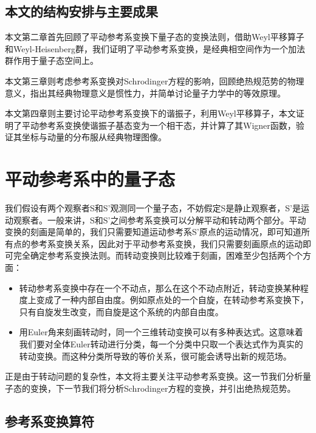 \documentclass[a4paper]{article}
\begin{document}
    \subsection{本文的结构安排与主要成果}

        本文第二章首先回顾了平动参考系变换下量子态的变换法则，借助Weyl平移算子和Weyl-Heisenberg群，我们证明了平动参考系变换，是经典相空间作为一个加法群作用于量子态空间上。

        本文第三章则考虑参考系变换对Schrodinger方程的影响，回顾绝热规范势的物理意义，指出其经典物理意义是惯性力，并简单讨论量子力学中的等效原理。

        本文第四章则主要讨论平动参考系变换下的谐振子，利用Weyl平移算子，本文证明了平动参考系变换使谐振子基态变为一个相干态，并计算了其Wigner函数，验证其坐标与动量的分布服从经典物理图像。



    \section{平动参考系中的量子态}
        
        我们假设有两个观察者S和S'观测同一个量子态，不妨假定S是静止观察者，S'是运动观察者。一般来讲，S和S'之间参考系变换可以分解平动和转动两个部分。平动变换的刻画是简单的，我们只需要知道运动参考系S'原点的运动情况，即可知道所有点的参考系变换关系，因此对于平动参考系变换，我们只需要刻画原点的运动即可完全确定参考系变换法则。而转动变换则比较难于刻画，困难至少包括两个个方面：
        
        \begin{itemize}
            \item 转动参考系变换中存在一个不动点，那么在这个不动点附近，转动变换某种程度上变成了一种内部自由度。例如原点处的一个自旋，在转动参考系变换下，只有自旋发生改变，而自旋是这个系统的内部自由度。
            \item 用Euler角来刻画转动时，同一个三维转动变换可以有多种表达式。这意味着我们要对全体Euler转动进行分类，每一个分类中只取一个表达式作为真实的转动变换。而这种分类所导致的等价关系，很可能会诱导出新的规范场。
        \end{itemize}
        
        正是由于转动问题的复杂性，本文将主要关注平动参考系变换。这一节我们分析量子态的变换，下一节我们将分析Schrodinger方程的变换，并引出绝热规范势。
        
    \subsection{参考系变换算符}
    
\end{document}
